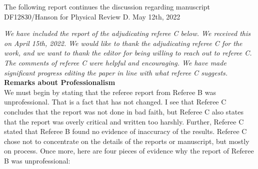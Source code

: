 \documentclass[12pt]{article}
\begin{document}
The following report continues the discussion regarding manuscript DF12830/Hanson for Physical Review D.  May 12th, 2022 \\ \vspace{0.25cm}

\textit{We have included the report of the adjudicating referee C below.  We received this on April 15th, 2022.  We would like to thank the adjudicating referee C for the work, and we want to thank the editor for being willing to reach out to referee C.  The comments of referee C were helpful and encouraging.  We have made significant progress editing the paper in line with what referee C suggests.} \\

\textbf{Remarks about Professionalism} \\ 

We must begin by stating that the referee report from Referee B was unprofessional.  That is a fact that has not changed.  I see that Referee C concludes that the report was not done in bad faith, but Referee C also states that the report was overly critical and written too harshly.  Further, Referee C stated that Referee B found no evidence of inaccuracy of the results.  Referee C chose not to concentrate on the details of the reports or manuscript, but mostly on process.  Once more, here are four pieces of evidence why the report of Referee B was unprofessional:
\end{document}
